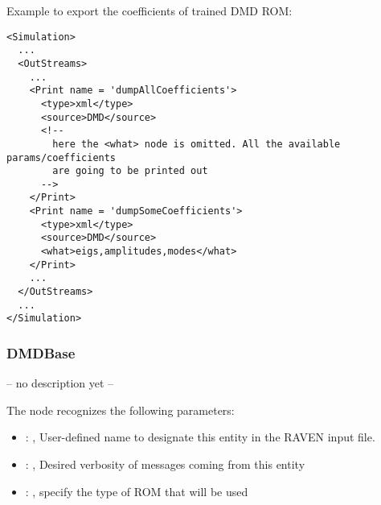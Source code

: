 Example to export the coefficients of trained DMD ROM:
\begin{lstlisting}[style=XML,morekeywords={name,subType}]
<Simulation>
  ...
  <OutStreams>
    ...
    <Print name = 'dumpAllCoefficients'>
      <type>xml</type>
      <source>DMD</source>
      <!--
        here the <what> node is omitted. All the available params/coefficients
        are going to be printed out
      -->
    </Print>
    <Print name = 'dumpSomeCoefficients'>
      <type>xml</type>
      <source>DMD</source>
      <what>eigs,amplitudes,modes</what>
    </Print>
    ...
  </OutStreams>
  ...
</Simulation>
\end{lstlisting}


\subsubsection{DMDBase}
  -- no description yet --

  The  node recognizes the following parameters:
    \begin{itemize}
      \item {}: ,
        User-defined name to designate this entity in the RAVEN input file.
      \item {}: ,
        Desired verbosity of messages coming from this entity
      \item {}: ,
        specify the type of ROM that will be used
  \end{itemize}

